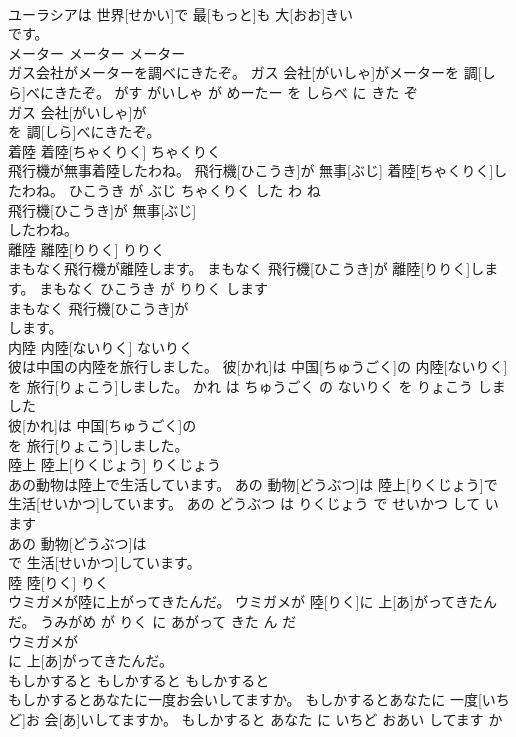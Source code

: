 \documentclass[8pt]{extreport}
\begin{document}
\begin{CJK}{UTF8}{min}
\\	ユーラシアは 世界[せかい]で 最[もっと]も 大[おお]きい
\\	です。			
\\	メーター	メーター	メーター	
\\	ガス会社がメーターを調べにきたぞ。	ガス 会社[がいしゃ]がメーターを 調[しら]べにきたぞ。	がす がいしゃ が めーたー を しらべ に きた ぞ	
\\	ガス 会社[がいしゃ]が
\\	を 調[しら]べにきたぞ。			
\\	着陸	着陸[ちゃくりく]	ちゃくりく	
\\	飛行機が無事着陸したわね。	飛行機[ひこうき]が 無事[ぶじ] 着陸[ちゃくりく]したわね。	ひこうき が ぶじ ちゃくりく した わ ね	
\\	飛行機[ひこうき]が 無事[ぶじ]
\\	したわね。			
\\	離陸	離陸[りりく]	りりく	
\\	まもなく飛行機が離陸します。	まもなく 飛行機[ひこうき]が 離陸[りりく]します。	まもなく ひこうき が りりく します	
\\	まもなく 飛行機[ひこうき]が
\\	します。			
\\	内陸	内陸[ないりく]	ないりく	
\\	彼は中国の内陸を旅行しました。	彼[かれ]は 中国[ちゅうごく]の 内陸[ないりく]を 旅行[りょこう]しました。	かれ は ちゅうごく の ないりく を りょこう しました	
\\	彼[かれ]は 中国[ちゅうごく]の
\\	を 旅行[りょこう]しました。			
\\	陸上	陸上[りくじょう]	りくじょう	
\\	あの動物は陸上で生活しています。	あの 動物[どうぶつ]は 陸上[りくじょう]で 生活[せいかつ]しています。	あの どうぶつ は りくじょう で せいかつ して います	
\\	あの 動物[どうぶつ]は
\\	で 生活[せいかつ]しています。			
\\	陸	陸[りく]	りく	
\\	ウミガメが陸に上がってきたんだ。	ウミガメが 陸[りく]に 上[あ]がってきたんだ。	うみがめ が りく に あがって きた ん だ	
\\	ウミガメが
\\	に 上[あ]がってきたんだ。			
\\	もしかすると	もしかすると	もしかすると	
\\	もしかするとあなたに一度お会いしてますか。	もしかするとあなたに 一度[いちど]お 会[あ]いしてますか。	もしかすると あなた に いちど おあい してます か	

\end{CJK}
\end{document}
